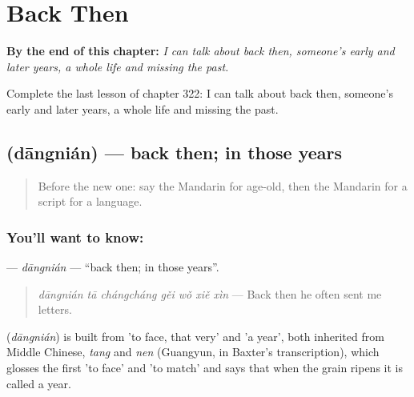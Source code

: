 
\chapter{Back Then}
\label{ch:zh-back-then}

\begin{chapteropening}
\textbf{By the end of this chapter:} \emph{I can talk about back then, someone's early and later years, a whole life and missing the past.}

Complete the last lesson of chapter 322: I can talk about back then, someone's early and later years, a whole life and missing the past.
\end{chapteropening}

\section[\texorpdfstring{\zh{当年} (dāngnián)}{当年 (dāngnián)}]{ (dāngnián) — back then; in those years}

\label{lesson:ZH-C322-dangnian}



\begin{quote}
Before the new one: say the Mandarin for age-old, then the Mandarin for a script for a language.
\end{quote}

\subsection*{You'll want to know: }
\textbf{} — \emph{dāngnián} — \textquotedblleft{}back then; in those years\textquotedblright{}.

\begin{quote}
\textbf{} \emph{dāngnián tā chángcháng gěi wǒ xiě xìn} — Back then he often sent me letters.
\end{quote}

\begin{cousinweb}
\textbf{} (\emph{dāngnián}) is built from  'to face, that very' and  'a year', both inherited from Middle Chinese, \emph{tang} and \emph{nen} (Guangyun, in Baxter's transcription), which glosses the first 'to face' and 'to match' and says that when the grain ripens it is called a year.
\end{cousinweb}

